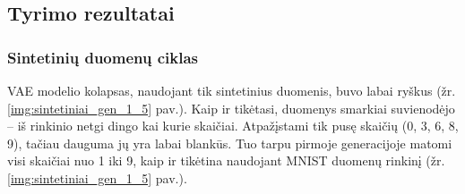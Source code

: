 \documentclass{VUMIFInfKursinis}
\begin{document}
\subsection{Tyrimo rezultatai}

\subsubsection{Sintetinių duomenų ciklas}
VAE modelio kolapsas, naudojant tik sintetinius duomenis, buvo labai ryškus (žr. \ref{img:sintetiniai_gen_1_5} pav.). Kaip ir tikėtasi, duomenys smarkiai suvienodėjo – iš rinkinio netgi dingo kai kurie skaičiai. Atpažįstami tik pusę skaičių (0, 3, 6, 8, 9), tačiau dauguma jų yra labai blankūs. Tuo tarpu pirmoje generacijoje matomi visi skaičiai nuo 1 iki 9, kaip ir tikėtina naudojant MNIST duomenų rinkinį (žr. \ref{img:sintetiniai_gen_1_5} pav.).
\end{document}
